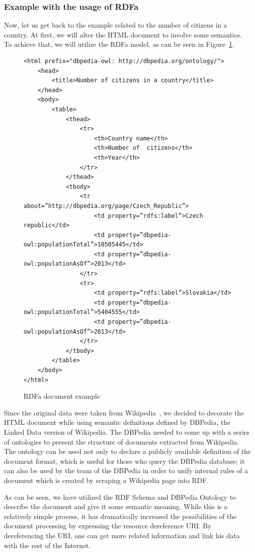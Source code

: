 \subsubsection{Example with the usage of RDFa}

Now, let us get back to the example related to the number of citizens in a country. At first, we
will alter the HTML document to involve some semantics. To achieve that, we will utilize the
RDFa model, as can be seen in Figure~\ref{fig:example-rdfa}.

\begin{figure}
\scriptsize\begin{verbatim}
<html prefix="dbpedia-owl: http://dbpedia.org/ontology/">
    <head>
        <title>Number of citizens in a country</title>
    </head>
    <body>
        <table>
            <thead>
                <tr>
                    <th>Country name</th>
                    <th>Number of  citizens</th>
                    <th>Year</th>
                </tr>
            </thead>
            <tbody>
                <tr about=”http://dbpedia.org/page/Czech_Republic”>
                    <td property=”rdfs:label”>Czech republic</td>
                    <td property=”dbpedia-owl:populationTotal”>10505445</td>
                    <td property=”dbpedia-owl:populationAsOf”>2013</td>
                </tr>
                <tr>
                    <td property=”rdfs:label”>Slovakia</td>
                    <td property=”dbpedia-owl:populationTotal”>5404555</td>
                    <td property=”dbpedia-owl:populationAsOf”>2013</td>
                </tr>
            </tbody>
        </table>
    </body>
</html>
\end{verbatim}\normalsize
\caption{RDFa document example}
\label{fig:example-rdfa}
\end{figure}

Since the original data were taken from Wikipedia~\cite{wikipedia}, we decided to decorate the HTML document
while using semantic definitions defined by DBPedia, the Linked Data version of Wikipedia. 
The DBPedia needed to come up with a series of ontologies to present the structure of documents
extracted from Wikipedia. The ontology can be used not only to declare a publicly available definition of 
the document format, which is useful for those who query the DBPedia database; it 
can also be used by the team of the DBPedia in order to unify internal rules of 
a document which is created by scraping a Wikipedia page into RDF.

As can be seen, we have utilized the RDF Schema and DBPedia Ontology to describe the document
and give it some semantic meaning. While this is a relatively simple process, it has dramatically
increased the possibilities of the document processing by expressing the resource dereference URI.
By dereferencing the URI, one can get more related information and link his data with the rest
of the Internet.

